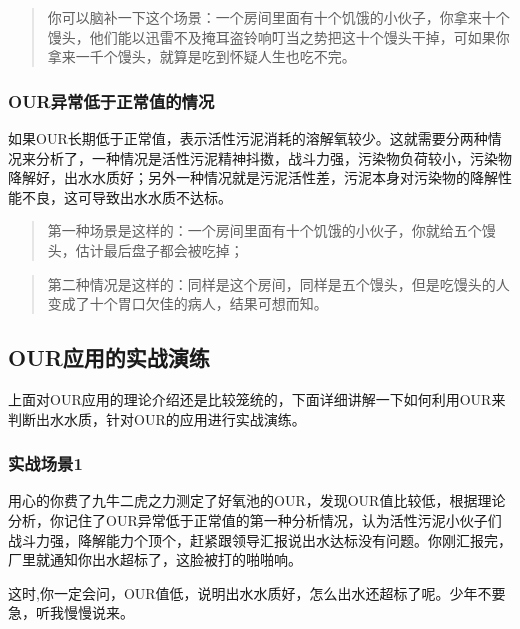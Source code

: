 \documentclass[]{book}
\begin{document}
\begin{quote}
你可以脑补一下这个场景：一个房间里面有十个饥饿的小伙子，你拿来十个馒头，他们能以迅雷不及掩耳盗铃响叮当之势把这十个馒头干掉，可如果你拿来一千个馒头，就算是吃到怀疑人生也吃不完。
\end{quote}

\hypertarget{ourux5f02ux5e38ux4f4eux4e8eux6b63ux5e38ux503cux7684ux60c5ux51b5}{%
\subsubsection{OUR异常低于正常值的情况}\label{ourux5f02ux5e38ux4f4eux4e8eux6b63ux5e38ux503cux7684ux60c5ux51b5}}

如果OUR长期低于正常值，表示活性污泥消耗的溶解氧较少。这就需要分两种情况来分析了，一种情况是活性污泥精神抖擞，战斗力强，污染物负荷较小，污染物降解好，出水水质好；另外一种情况就是污泥活性差，污泥本身对污染物的降解性能不良，这可导致出水水质不达标。

\begin{quote}
第一种场景是这样的：一个房间里面有十个饥饿的小伙子，你就给五个馒头，估计最后盘子都会被吃掉；
\end{quote}

\begin{quote}
第二种情况是这样的：同样是这个房间，同样是五个馒头，但是吃馒头的人变成了十个胃口欠佳的病人，结果可想而知。
\end{quote}

\hypertarget{ourux5e94ux7528ux7684ux5b9eux6218ux6f14ux7ec3}{%
\subsection{OUR应用的实战演练}\label{ourux5e94ux7528ux7684ux5b9eux6218ux6f14ux7ec3}}

上面对OUR应用的理论介绍还是比较笼统的，下面详细讲解一下如何利用OUR来判断出水水质，针对OUR的应用进行实战演练。

\hypertarget{ux5b9eux6218ux573aux666f1}{%
\subsubsection{实战场景1}\label{ux5b9eux6218ux573aux666f1}}

用心的你费了九牛二虎之力测定了好氧池的OUR，发现OUR值比较低，根据理论分析，你记住了OUR异常低于正常值的第一种分析情况，认为活性污泥小伙子们战斗力强，降解能力个顶个，赶紧跟领导汇报说出水达标没有问题。你刚汇报完，厂里就通知你出水超标了，这脸被打的啪啪响。

这时,你一定会问，OUR值低，说明出水水质好，怎么出水还超标了呢。少年不要急，听我慢慢说来。
\end{document}
